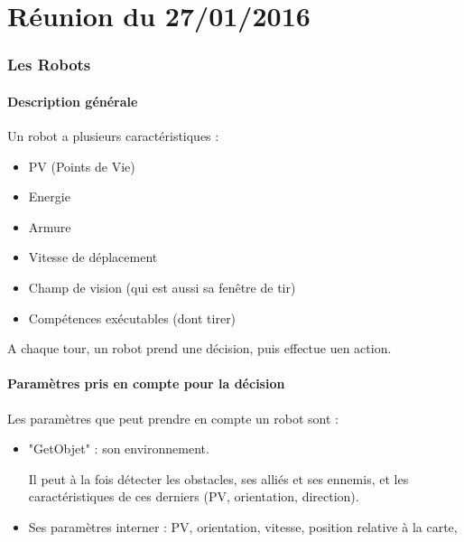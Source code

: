 \documentclass[10pt]{article}
\begin{document}
\part*{{Réunion du 27/01/2016}}

\renewcommand{\contentsname}{Sommaire}
\tableofcontents





\newpage

\section{Les Robots}

\subsection{Description générale}

Un robot a plusieurs caractéristiques : 

\begin{itemize}
\item PV (Points de Vie)
\item Energie
\item Armure
\item Vitesse de déplacement
\item Champ de vision (qui est aussi sa fenêtre de tir)
\item Compétences exécutables (dont tirer)

\end{itemize}

A chaque tour, un robot prend une décision, puis effectue uen action.



\subsection{Paramètres pris en compte pour la décision}

Les paramètres que peut prendre en compte un robot sont :
\begin{itemize}

\item "GetObjet" : son environnement.

Il peut à la fois détecter les obstacles, ses alliés et ses ennemis, et les caractéristiques de ces derniers (PV, orientation, direction).

\item Ses paramètres interner : PV, orientation, vitesse, position relative à la carte, 

\end{itemize}
\end{document}
